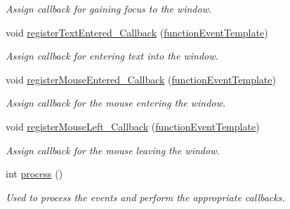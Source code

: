\begin{DoxyCompactItemize}
\begin{DoxyCompactList}\small\item\em Assign callback for gaining focus to the window. \end{DoxyCompactList}\item 
\hypertarget{class_event_system_a3df79c06a12ba9329c9016810d89ccca}{void \hyperlink{class_event_system_a3df79c06a12ba9329c9016810d89ccca}{register\-Text\-Entered\-\_\-\-Callback} (\hyperlink{_callback_manager_8h_a3459e948765053b6cb9e3b0b5efb5906}{function\-Event\-Template})}\label{dc/d0b/class_event_system_a3df79c06a12ba9329c9016810d89ccca}

\begin{DoxyCompactList}\small\item\em Assign callback for entering text into the window. \end{DoxyCompactList}\item 
\hypertarget{class_event_system_ae6ed70abde46edd16a7d24fc4b32761f}{void \hyperlink{class_event_system_ae6ed70abde46edd16a7d24fc4b32761f}{register\-Mouse\-Entered\-\_\-\-Callback} (\hyperlink{_callback_manager_8h_a3459e948765053b6cb9e3b0b5efb5906}{function\-Event\-Template})}\label{dc/d0b/class_event_system_ae6ed70abde46edd16a7d24fc4b32761f}

\begin{DoxyCompactList}\small\item\em Assign callback for the mouse entering the window. \end{DoxyCompactList}\item 
\hypertarget{class_event_system_a704c259f20d80225710d439a73adde37}{void \hyperlink{class_event_system_a704c259f20d80225710d439a73adde37}{register\-Mouse\-Left\-\_\-\-Callback} (\hyperlink{_callback_manager_8h_a3459e948765053b6cb9e3b0b5efb5906}{function\-Event\-Template})}\label{dc/d0b/class_event_system_a704c259f20d80225710d439a73adde37}

\begin{DoxyCompactList}\small\item\em Assign callback for the mouse leaving the window. \end{DoxyCompactList}\item 
\hypertarget{class_event_system_abe8b09889b2238008f8b08785322b298}{int \hyperlink{class_event_system_abe8b09889b2238008f8b08785322b298}{process} ()}\label{dc/d0b/class_event_system_abe8b09889b2238008f8b08785322b298}

\begin{DoxyCompactList}\small\item\em Used to process the events and perform the appropriate callbacks. \end{DoxyCompactList}\end{DoxyCompactItemize}

